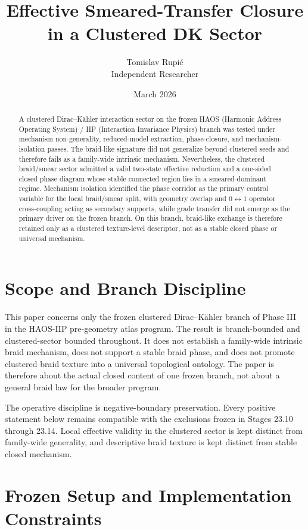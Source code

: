 \documentclass[11pt]{article}
\title{Effective Smeared-Transfer Closure in a Clustered DK Sector}
\author{Tomislav Rupi\'c \\ Independent Researcher}
\date{March 2026}
\begin{document}
\maketitle

\begin{abstract}
A clustered Dirac--K\"ahler interaction sector on the frozen HAOS (Harmonic Address Operating System) / IIP (Interaction Invariance Physics) branch was tested under mechanism non-generality, reduced-model extraction, phase-closure, and mechanism-isolation passes. The braid-like signature did not generalize beyond clustered seeds and therefore fails as a family-wide intrinsic mechanism. Nevertheless, the clustered braid/smear sector admitted a valid two-state effective reduction and a one-sided closed phase diagram whose stable connected region lies in a smeared-dominant regime. Mechanism isolation identified the phase corridor as the primary control variable for the local braid/smear split, with geometry overlap and $0 \leftrightarrow 1$ operator cross-coupling acting as secondary supports, while grade transfer did not emerge as the primary driver on the frozen branch. On this branch, braid-like exchange is therefore retained only as a clustered texture-level descriptor, not as a stable closed phase or universal mechanism.
\end{abstract}

\section{Scope and Branch Discipline}

This paper concerns only the frozen clustered Dirac--K\"ahler branch of Phase III in the HAOS-IIP pre-geometry atlas program. The result is branch-bounded and clustered-sector bounded throughout. It does not establish a family-wide intrinsic braid mechanism, does not support a stable braid phase, and does not promote clustered braid texture into a universal topological ontology. The paper is therefore about the actual closed content of one frozen branch, not about a general braid law for the broader program.

The operative discipline is negative-boundary preservation. Every positive statement below remains compatible with the exclusions frozen in Stages 23.10 through 23.14. Local effective validity in the clustered sector is kept distinct from family-wide generality, and descriptive braid texture is kept distinct from stable closed mechanism.

\section{Frozen Setup and Implementation Constraints}
\end{document}
